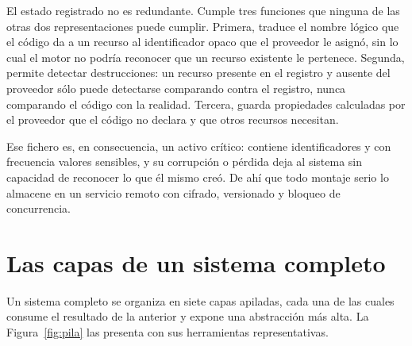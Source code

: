 \documentclass[11pt,letterpaper]{article}
\begin{document}
El estado registrado no es redundante. Cumple tres funciones que ninguna de
las otras dos representaciones puede cumplir. Primera, traduce el nombre
lógico que el código da a un recurso al identificador opaco que el proveedor
le asignó, sin lo cual el motor no podría reconocer que un recurso existente
le pertenece. Segunda, permite detectar destrucciones: un recurso presente en
el registro y ausente del proveedor sólo puede detectarse comparando contra el
registro, nunca comparando el código con la realidad. Tercera, guarda
propiedades calculadas por el proveedor que el código no declara y que otros
recursos necesitan.

Ese fichero es, en consecuencia, un activo crítico: contiene identificadores y
con frecuencia valores sensibles, y su corrupción o pérdida deja al sistema
sin capacidad de reconocer lo que él mismo creó. De ahí que todo montaje serio
lo almacene en un servicio remoto con cifrado, versionado y bloqueo de
concurrencia.

\section{Las capas de un sistema completo}
\label{sec:capas}

Un sistema completo se organiza en siete capas apiladas, cada una de las
cuales consume el resultado de la anterior y expone una abstracción más alta.
La Figura~\ref{fig:pila} las presenta con sus herramientas representativas.
\end{document}
